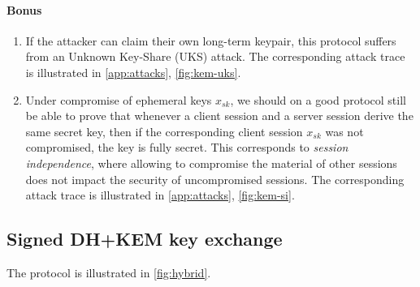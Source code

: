 \documentclass[11pt]{article}
\newcommand{\sfsk}{\mathit{sk}}
\begin{document}
\paragraph{Bonus}
\begin{enumerate}
\item If the attacker can claim their own long-term keypair, this protocol suffers from an Unknown Key-Share (UKS) attack. The corresponding attack trace is illustrated in \cref{app:attacks}, \cref{fig:kem-uks}.
\item  Under compromise of ephemeral keys $x_\sfsk$, we should on a good protocol still be able to prove that whenever a client session and a server session derive the same secret key, then if the corresponding client session $x_\sfsk$ was not compromised, the key is fully secret. This corresponds to \emph{session independence}, where allowing to compromise the material of other sessions does not impact the security of uncompromised sessions.  The corresponding attack trace is illustrated in \cref{app:attacks}, \cref{fig:kem-si}.  
\end{enumerate}


\subsection{Signed DH+KEM key exchange}\label{prob:hybrid}

The protocol is illustrated in \cref{fig:hybrid}.
\end{document}
